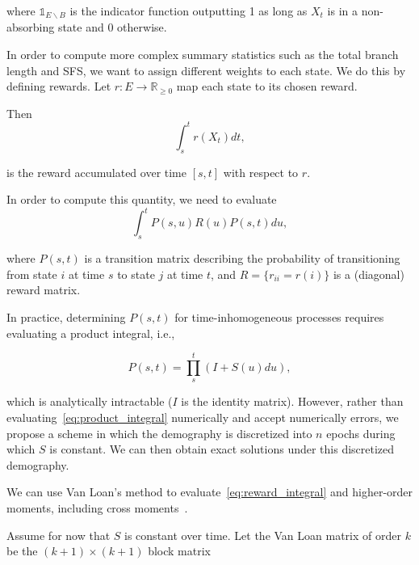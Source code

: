 \documentclass[hidelinks,11pt]{article}
\begin{document}
    where $\mathds{1}_{E \backslash B}$ is the indicator function outputting 1 as long as $X_t$ is in a non-absorbing state and 0 otherwise.

    In order to compute more complex summary statistics such as the total branch length and SFS, we want to assign different weights to each state.
    We do this by defining rewards.
    Let $r: E \rightarrow \mathbb{R}_{\geq 0}$ map each state to its chosen reward.

    Then
    \begin{equation*}
        \int_s^{t} r(X_t) dt,
    \end{equation*}

    is the reward accumulated over time $[s, t]$ with respect to $r$.

    In order to compute this quantity, we need to evaluate
    \begin{equation}
        \label{eq:reward_integral}
        \int_s^t P(s,u)R(u)P(s,t) du,
    \end{equation}

    where $P(s,t)$ is a transition matrix describing the probability of transitioning from state $i$ at time $s$ to state $j$ at time $t$, and $R=\{r_{ii}=r(i)\}$ is a (diagonal) reward matrix.

    In practice, determining $P(s,t)$ for time-inhomogeneous processes requires evaluating a product integral, i.e.,

    \begin{equation}
        \label{eq:product_integral}
        P(s,t) = \prod_s^t (I + S(u) du),
    \end{equation}

    which is analytically intractable ($I$ is the identity matrix).
    However, rather than evaluating~\eqref{eq:product_integral} numerically and accept numerically errors, we propose a scheme in which the demography is discretized into $n$ epochs during which $S$ is constant.
    We can then obtain exact solutions under this discretized demography.

    We can use Van Loan's method to evaluate~\eqref{eq:reward_integral} and higher-order moments, including cross moments~\citep{van_loan_popgen,van_loan}.

    Assume for now that $S$ is constant over time.
    Let the Van Loan matrix of order $k$ be the $(k+1) \times (k+1)$ block matrix
\end{document}

